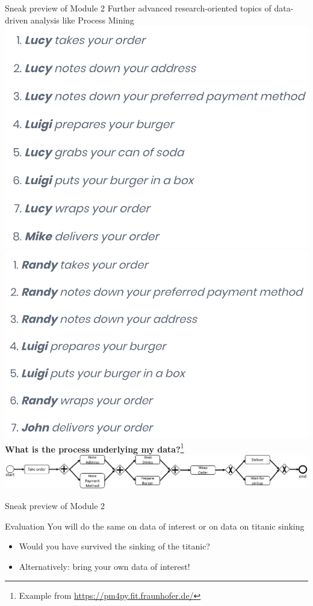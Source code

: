 \documentclass{beamer}%
\begin{document}
\begin{frame}{Sneak preview of Module 2}
	\centering 
	Further advanced research-oriented topics of data-driven analysis like Process Mining \\
	
	\includegraphics[width=0.4\linewidth]{figures/lucy.png}
	\includegraphics[width=0.4\linewidth]{figures/randy.png}\\
		\textbf{What is the process underlying my data?}\footnote{Example from \url{https://pm4py.fit.fraunhofer.de/}}\\
	\includegraphics[width=0.9\linewidth]{figures/simple_sample_model.png}
	
\end{frame}

\begin{frame}{Sneak preview of Module 2}
	\begin{block}{Evaluation}
		You will do the same on data of interest or on data on titanic sinking
	\begin{itemize}
		\item Would you have survived the sinking of the titanic?
	\end{itemize}
\begin{itemize}
	\item Alternatively: bring your own data of interest!
\end{itemize}
	\end{block}
	
\end{frame}
\end{document}
